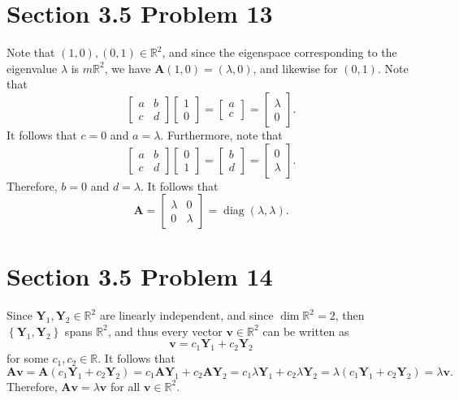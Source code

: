 \documentclass[11pt, letterpaper]{report}
\begin{document}
\section*{Section 3.5 Problem 13}
Note that $(1,0),(0,1)\in\mathbb{R}^2$, and since the eigenspace corresponding to the eigenvalue $\lambda $ is $m\mathbb{R}^2$, we have $\mathbf{A}(1,0)=(\lambda ,0)$, and likewise for $(0,1)$. Note that
\[\begin{bmatrix} a&b \\ c&d \end{bmatrix} \begin{bmatrix} 1 \\ 0 \end{bmatrix} =\begin{bmatrix} a \\ c \end{bmatrix} =\begin{bmatrix} \lambda  \\ 0 \end{bmatrix} .\]
It follows that $c=0$ and $a=\lambda $. Furthermore, note that
\[
	\begin{bmatrix} a&b \\ c&d \end{bmatrix} \begin{bmatrix} 0 \\ 1 \end{bmatrix} =\begin{bmatrix} b\\ d \end{bmatrix} =\begin{bmatrix} 0 \\ \lambda  \end{bmatrix} 
.\]
Therefore, $b=0$ and $d=\lambda $. It follows that
\[
	\mathbf{A}=\begin{bmatrix} \lambda &0 \\ 0&\lambda  \end{bmatrix} =\operatorname{diag }(\lambda ,\lambda ) 
.\]
\section*{Section 3.5 Problem 14}
Since $\mathbf{Y}_1,\mathbf{Y}_2\in\mathbb{R}^2$ are linearly independent, and since $\dim \mathbb{R}^2=2$, then $\left\{ \mathbf{Y}_1,\mathbf{Y}_2 \right\} $ spans $\mathbb{R}^2$, and thus every vector $\mathbf{v}\in\mathbb{R}^2$ can be written as
\[
	\mathbf{v}=c_1 \mathbf{Y}_1+c_2\mathbf{Y}_2
\]
for some $c_1,c_2\in\mathbb{R}$. It follows that
\[
	\mathbf{Av}=\mathbf{A}\left( c_1 \mathbf{Y}_1+c_2 \mathbf{Y}_2 \right) =c_1 \mathbf{AY}_1+c_2 \mathbf{AY}_2=c_1\lambda \mathbf{Y}_1+c_2\lambda \mathbf{Y}_2=\lambda \left( c_1\mathbf{Y}_1 +c_2 \mathbf{Y}_2\right) =\lambda \mathbf{v}
.\]
Therefore, $\mathbf{Av}=\lambda \mathbf{v}$ for all $\mathbf{v}\in\mathbb{R}^2$.
\end{document}
